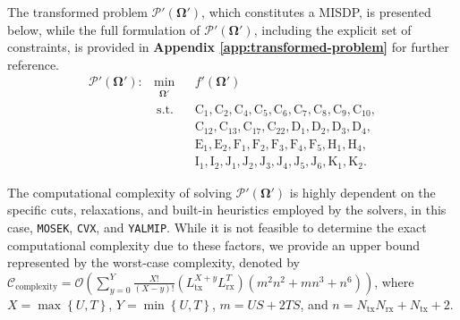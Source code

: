 \documentclass[10pt,journal,compsoc]{IEEEtran}
\theoremstyle{myremark}
\theoremstyle{myexample}
\begin{document}
The transformed problem $ \mathcal{P}' \left( \boldsymbol{\Omega}' \right) $, which constitutes a \gls{MISDP}, is presented below, while the full formulation of $ \mathcal{P}' \left( \boldsymbol{\Omega}' \right) $, including the explicit set of constraints, is provided in \textbf{Appendix \ref{app:transformed-problem}} for further reference.
\begin{align*} 
	\mathcal{P}' \left( \boldsymbol{\Omega}' \right): & \min_{
			\substack{ \boldsymbol{\Omega}' }
	} 
	& & f'\left( \boldsymbol{\Omega}' \right)
	\\
	& ~ \mathrm{s.t.} & & \mathrm{C}_{1}, \mathrm{C}_{2}, \mathrm{C}_{4}, \mathrm{C}_{5}, \mathrm{C}_{6}, \mathrm{C}_{7}, \mathrm{C}_{8}, \mathrm{C}_{9}, \mathrm{C}_{10}, 
	\\
	& & & \mathrm{C}_{12}, \mathrm{C}_{13}, \mathrm{C}_{17}, \mathrm{C}_{22}, \mathrm{D}_{1}, \mathrm{D}_{2}, \mathrm{D}_{3}, \mathrm{D}_{4}, 
	\\
	& & & \mathrm{E}_{1}, \mathrm{E}_{2}, \mathrm{F}_{1}, \mathrm{F}_{2}, \mathrm{F}_{3}, \mathrm{F}_{4}, \mathrm{F}_{5}, \mathrm{H}_{1}, \mathrm{H}_{4},
	\\ 
	& & &  \mathrm{I}_{1}, \mathrm{I}_{2}, \mathrm{J}_{1}, \mathrm{J}_{2}, \mathrm{J}_{3}, \mathrm{J}_{4}, \mathrm{J}_{5}, \mathrm{J}_{6}, \mathrm{K}_{1}, \mathrm{K}_{2}.
\end{align*}

The computational complexity of solving $ \mathcal{P}' \left( \boldsymbol{\Omega}' \right) $ is highly dependent on the specific cuts, relaxations, and built-in heuristics employed by the solvers, in this case, \texttt{MOSEK}, \texttt{CVX}, and \texttt{YALMIP}. While it is not feasible to determine the exact computational complexity due to these factors, we provide an upper bound represented by the worst-case complexity, denoted by  $ \mathcal{C}_\mathrm{complexity} = \mathcal{O} \left(  \sum_{y = 0}^{Y}\frac{X!}{(X-y)!} \left(  L_\mathrm{tx}^{X+y}  L_\mathrm{rx}^{T} \right)  \left( m^2 n^2 + m n^3 + n^6 \right) \right) $, where $ X = \max \left\lbrace U, T \right\rbrace $, $ Y = \min \left\lbrace U, T \right\rbrace $, $ m = US + 2TS $, and $ n = N_\mathrm{tx} N_\mathrm{rx} + N_\mathrm{tx} + 2 $.
\end{document}
